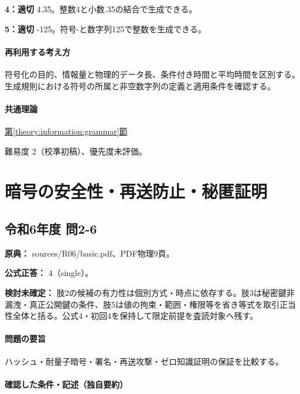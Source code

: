 \noindent\textbf{4：適切} 4.35。整数4と小数.35の結合で生成できる。\par

\noindent\textbf{5：適切} -125。符号-と数字列125で整数を生成できる。\par

\paragraph{再利用する考え方} 符号化の目的、情報量と物理的データ長、条件付き時間と平均時間を区別する。生成規則における符号の所属と非空数字列の定義と適用条件を確認する。

\paragraph{共通理論} \hyperref[theory:information:grammar]{第\ref*{theory:information:grammar}節}

\par 難易度 2（校準初稿）、優先度未評価。

\section{暗号の安全性・再送防止・秘匿証明}

\subsection{令和6年度 問2-6}
\label{q:r06-reg-basic-2-6}

\noindent\textbf{原典：} sources/R06/basic.pdf、PDF物理9頁。

\textbf{公式正答：} 4（single）。

\par\textbf{検討未確定：} 肢2の候補の有力性は個別方式・時点に依存する。肢3は秘密鍵非漏洩・真正公開鍵の条件、肢5は値の拘束・範囲・権限等を省き等式を取引正当性全体と括る。公式4・初回4を保持して限定前提を査読対象へ残す。

\paragraph{問題の要旨} ハッシュ・耐量子暗号・署名・再送攻撃・ゼロ知識証明の保証を比較する。

\paragraph{確認した条件・記述（独自要約）}\mbox{}\par

